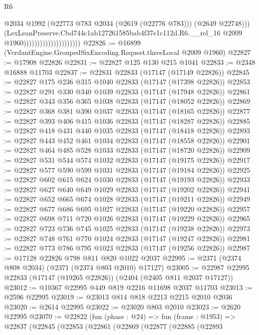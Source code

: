 \begin{lexlean}{R6}
\begin{coremodule}
                                                @2034
                                                @1992
                                                (@22773 @783 @2034 (@2619 (@22776 @783)))
                                                (@2649 @22748)))
                                            (LexLeanPreserve.Cbd744c1ab127261585bab4f37e1c112d.R6.__rel_16
                                              @2009
                                              @1960)))))))))))))))))))))
@22826 := @16899 (VerdantEngine.GroupedSixEncoding.Request.threeLocal @2009 @1960)
@22827 := @17908 @22826
@22831 := @22827 @125 @130 @215 @1041
@22833 := @2348 @16888 @11703
@22837 := @22831 @22833 (@17147 (@17149 @22826))
@22845 := @22827 @175 @236 @315 @1040 @22833 (@17147 (@17398 @22826))
@22853 := @22827 @291 @330 @340 @1039 @22833 (@17147 (@17948 @22826))
@22861 := @22827 @343 @356 @365 @1038 @22833 (@17147 (@18052 @22826))
@22869 := @22827 @368 @381 @390 @1037 @22833 (@17147 (@18165 @22826))
@22877 := @22827 @393 @406 @415 @1036 @22833 (@17147 (@18287 @22826))
@22885 := @22827 @418 @431 @440 @1035 @22833 (@17147 (@18418 @22826))
@22893 := @22827 @443 @452 @461 @1034 @22833 (@17147 (@18558 @22826))
@22901 := @22827 @464 @485 @528 @1033 @22833 (@17147 (@18720 @22826))
@22909 := @22827 @531 @544 @574 @1032 @22833 (@17147 (@19175 @22826))
@22917 := @22827 @577 @590 @599 @1031 @22833 (@17147 (@19184 @22826))
@22925 := @22827 @602 @615 @624 @1030 @22833 (@17147 (@19193 @22826))
@22933 := @22827 @627 @640 @649 @1029 @22833 (@17147 (@19202 @22826))
@22941 := @22827 @652 @665 @674 @1028 @22833 (@17147 (@19211 @22826))
@22949 := @22827 @677 @686 @695 @1027 @22833 (@17147 (@19220 @22826))
@22957 := @22827 @698 @711 @720 @1026 @22833 (@17147 (@19229 @22826))
@22965 := @22827 @723 @736 @745 @1025 @22833 (@17147 (@19238 @22826))
@22973 := @22827 @748 @761 @770 @1024 @22833 (@17147 (@19247 @22826))
@22981 := @22827 @773 @786 @795 @1023 @22833 (@17147 (@19256 @22826))
@22987 := @17128 @22826 @798 @811 @820 @1022 @2037
@22995 := @2371 (@2374 @808 @2034) (@2371 (@2374 @803 @2010) @17127)
@23005 := @22987 @22995 @22833 (@17147 (@19265 @22826)) (@2404 (@2405 @811 @2037 @17127))
@23012 := @10367 @22995 @449 @819 @2216 @11698 @2037 @11703
@23013 := @2596 @22995
@23019 := @23013 @814 @818 @2213 @2215 @2010 @2036
@23020 := @2614 @22995
@23022 := @23020 @803 @2010
@23023 := @2620 @22995
@23070 := @22822
    (fun (phase : @24) =>
    fun (frame : @1953) =>
    @22837
      (@22845
        (@22853
          (@22861
            (@22869
              (@22877
                (@22885
                  (@22893

\end{coremodule}
\end{lexlean}
